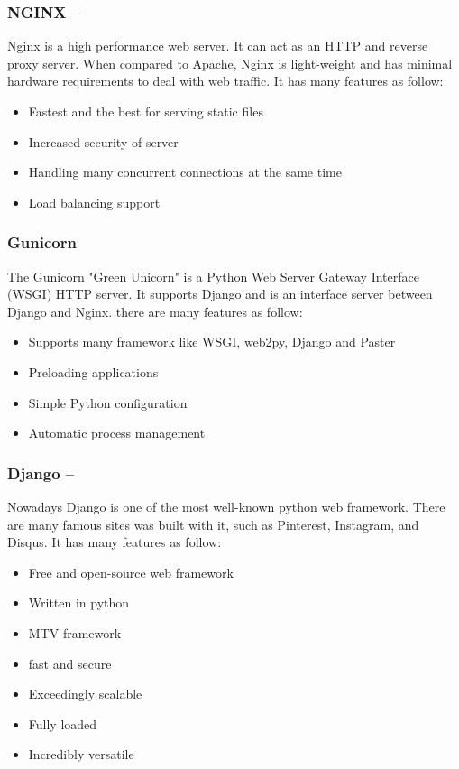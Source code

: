 \subsubsection*{NGINX  --  }
Nginx is a high performance web server. It can act as an HTTP and reverse proxy server. 
When compared to Apache, Nginx is light-weight and has minimal hardware requirements 
to deal with web traffic. It has many features as follow:
\begin{itemize}
	\item Fastest and the best for serving static files
	\item Increased security of server
	\item Handling many concurrent connections at the same time
	\item Load balancing support
\end{itemize}

\subsubsection*{Gunicorn}
The Gunicorn "Green Unicorn" is a Python Web Server Gateway Interface (WSGI) HTTP server. 
It supports Django and is an interface server between Django and Nginx.
there are many features as follow:
\begin{itemize}
	\item Supports many framework like WSGI, web2py, Django and Paster
	\item Preloading applications
	\item Simple Python configuration
	\item Automatic process management
\end{itemize}

\subsubsection*{Django  --  }
Nowadays Django is one of the most well-known python web framework. There are many famous 
sites was built with it, such as Pinterest, Instagram, and Disqus. 
It has many features as follow:
\begin{itemize}
	\item Free and open-source web framework
	\item Written in python
	\item MTV framework
	\item fast and secure
	\item Exceedingly scalable
	\item Fully loaded
	\item Incredibly versatile
\end{itemize}

